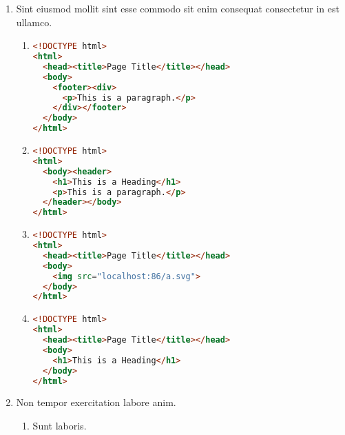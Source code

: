 \documentclass[a4paper,12pt]{article}
\begin{document}
\begin{enumerate}[label=\textbf{\arabic*.}]
\begin{multicols}{2}
\begin{enumerate}
		\item  Excepteur laboris excepteur laboris.
  
		\item  Excepteur laboris.
    
		\item  Excepteur laboris excepteur laboris.
    
	\end{enumerate}

\end{multicols}
\item Sint eiusmod mollit sint esse commodo sit enim consequat consectetur in est ullamco.
	\begin{enumerate}
		\item  \hfill \vspace*{-7mm}
    \begin{lstlisting}[language=HTML]
<!DOCTYPE html>
<html>
  <head><title>Page Title</title></head>
  <body>
    <footer><div>
      <p>This is a paragraph.</p>
    </div></footer>
  </body>
</html>
    \end{lstlisting}
  
		\item  \hfill \vspace*{-7mm}
    \begin{lstlisting}[language=HTML]
<!DOCTYPE html> 
<html>
  <body><header>
    <h1>This is a Heading</h1>
    <p>This is a paragraph.</p>
  </header></body>
</html>
    \end{lstlisting}
    
		\item  \hfill \vspace*{-7mm}
    \begin{lstlisting}[language=HTML]
<!DOCTYPE html>
<html>
  <head><title>Page Title</title></head>
  <body>
    <img src="localhost:86/a.svg">
  </body>
</html>
    \end{lstlisting}
    
		\item  \hfill \vspace*{-7mm}
    \begin{lstlisting}[language=HTML]
<!DOCTYPE html>
<html>
  <head><title>Page Title</title></head>
  <body>
    <h1>This is a Heading</h1>
  </body>
</html>
    \end{lstlisting}
    
	\end{enumerate}

\item Non tempor exercitation labore anim.
\begin{multicols}{2}
	\begin{enumerate}
		\item  Sunt laboris.
    

\end{enumerate}
\end{multicols}
\end{enumerate}
\end{document}
